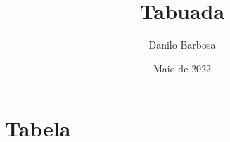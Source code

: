 \documentclass[a4paper]{article}
\title{Tabuada}
\author{Danilo Barbosa}
\date{Maio de 2022}
\begin{document}
    \maketitle

    \section{Tabela}

        
\end{document}
